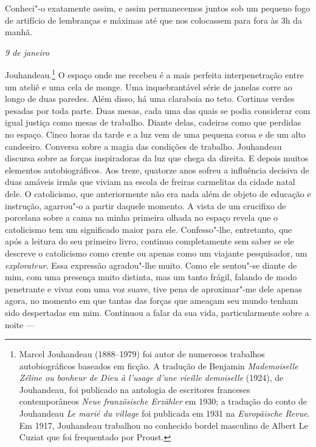 Conheci"-o exatamente assim, e assim permanecemos juntos sob um pequeno
fogo de artifício de lembranças e máximas até que nos colocassem para
fora às 3h da manhã.

\begin{flushright}
\emph{9 de janeiro}
\end{flushright}

Jouhandeau.\footnote{Marcel Jouhandeau
  (1888--1979) foi autor de numerosos trabalhos autobiográficos baseados
  em ficção. A tradução de Benjamin \emph{Mademoiselle Zéline ou bonheur
  de Dieu à l'usage d'une vieille demoiselle} (1924), de Jouhandeau, foi
  publicado na antologia de escritores franceses contemporâneos
  \emph{Neue französische Erzähler} em 1930; a tradução do conto de
  Jouhandeau \emph{Le marié du village} foi publicada em 1931 na
  \emph{Europäische Revue}. Em 1917, Jouhandeau trabalhou no conhecido
  bordel masculino de Albert Le Cuziat que foi frequentado por Proust. \versal{[N.~O.]}}
O espaço onde me recebeu é a mais perfeita interpenetração entre um
ateliê e uma cela de monge. Uma inquebrantável série de janelas corre ao
longo de duas paredes. Além disso, há uma claraboia no teto. Cortinas
verdes pesadas por toda parte. Duas mesas, cada uma das quais se podia
considerar com igual justiça como mesas de trabalho. Diante delas,
cadeiras como que perdidas no espaço. Cinco horas da tarde e a luz vem
de uma pequena coroa e de um alto candeeiro. Conversa sobre a magia das
condições de trabalho. Jouhandeau discursa sobre as forças inspiradoras
da luz que chega da direita. E depois muitos elementos autobiográficos.
Aos treze, quatorze anos sofreu a influência decisiva de duas amáveis
irmãs que viviam na escola de freiras carmelitas da cidade natal dele. O
catolicismo, que anteriormente não era nada além de objeto de educação e
instrução, agarrou"-o a partir daquele momento. A vista de um crucifixo de
porcelana sobre a cama na minha primeira olhada no espaço revela que o
catolicismo tem um significado maior para ele. Confesso"-lhe, entretanto,
que após a leitura do seu primeiro livro, continuo completamente sem
saber se ele descreve o catolicismo como crente ou apenas como um
viajante pesquisador, um \emph{explorateur}. Essa expressão agradou"-lhe
muito. Como ele sentou"-se diante de mim, com uma presença muito
distinta, mas um tanto frágil, falando de modo penetrante e vivaz com
uma voz suave, tive pena de aproximar"-me dele apenas agora, no momento
em que tantas das forças que ameaçam seu mundo tenham sido despertadas
em mim. Continuou a falar da sua vida, particularmente sobre a noite ---
